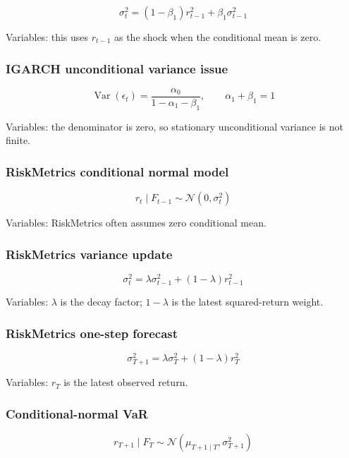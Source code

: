 \documentclass[
  8pt,
  twocolumn]{extarticle}
\begin{document}
\[
\sigma_t^2=(1-\beta_1)r_{t-1}^2+\beta_1\sigma_{t-1}^2
\]

Variables: this uses \(r_{t-1}\) as the shock when the conditional mean
is zero.

\subsubsection{IGARCH unconditional variance
issue}\label{igarch-unconditional-variance-issue}

\[
\operatorname{Var}(\epsilon_t)=\frac{\alpha_0}{1-\alpha_1-\beta_1},\qquad \alpha_1+\beta_1=1
\]

Variables: the denominator is zero, so stationary unconditional variance
is not finite.

\subsubsection{RiskMetrics conditional normal
model}\label{riskmetrics-conditional-normal-model}

\[
r_t\mid F_{t-1}\sim\mathcal N(0,\sigma_t^2)
\]

Variables: RiskMetrics often assumes zero conditional mean.

\subsubsection{RiskMetrics variance
update}\label{riskmetrics-variance-update}

\[
\sigma_t^2=\lambda\sigma_{t-1}^2+(1-\lambda)r_{t-1}^2
\]

Variables: \(\lambda\) is the decay factor; \(1-\lambda\) is the latest
squared-return weight.

\subsubsection{RiskMetrics one-step
forecast}\label{riskmetrics-one-step-forecast}

\[
\sigma_{T+1}^2=\lambda\sigma_T^2+(1-\lambda)r_T^2
\]

Variables: \(r_T\) is the latest observed return.

\subsubsection{Conditional-normal VaR}\label{conditional-normal-var}

\[
r_{T+1}\mid F_T\sim\mathcal N(\mu_{T+1\mid T},\sigma_{T+1}^2)
\]
\end{document}
